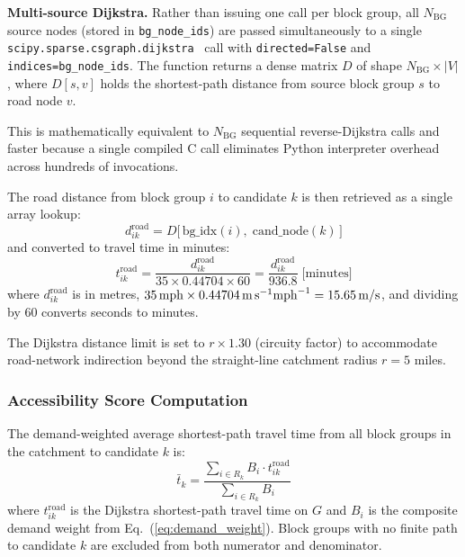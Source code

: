 \documentclass[conference]{IEEEtran}
\begin{document}
\textbf{Multi-source Dijkstra.} Rather than issuing one call per
block group, all $N_{\text{BG}}$ source nodes (stored in
\texttt{bg\_node\_ids}) are passed simultaneously to a single
\texttt{scipy.sparse.csgraph.dijkstra}~\cite{Virtanen2020} call
with \texttt{directed=False} and \texttt{indices=bg\_node\_ids}.
The function returns a dense matrix $D$ of shape
$N_{\text{BG}} \times |V|$, where $D[s, v]$ holds the
shortest-path distance from source block group $s$ to road node $v$.

This is mathematically equivalent to $N_{\text{BG}}$ sequential
reverse-Dijkstra calls and faster because a single compiled C call
eliminates Python interpreter overhead across hundreds of invocations.

The road distance from block group $i$ to candidate $k$ is then
retrieved as a single array lookup:
\begin{equation}
d_{ik}^{\text{road}} = D\bigl[\,\text{bg\_idx}(i),\;
                                \text{cand\_node}(k)\,\bigr]
\label{eq:lookup}
\end{equation}
and converted to travel time in minutes:
\begin{equation}
t_{ik}^{\text{road}}
  = \frac{d_{ik}^{\text{road}}}{35 \times 0.44704 \times 60}
  = \frac{d_{ik}^{\text{road}}}{936.8}\;\text{[minutes]}
\label{eq:ttime}
\end{equation}
where $d_{ik}^{\text{road}}$ is in metres, $35\,\text{mph} \times
0.44704\,\text{m\,s}^{-1}\text{mph}^{-1} = 15.65\,\text{m/s}$,
and dividing by 60 converts seconds to minutes.

The Dijkstra distance limit is set to $r \times 1.30$ (circuity
factor) to accommodate road-network indirection beyond the
straight-line catchment radius $r = 5$ miles.

\subsubsection{Accessibility Score Computation}

The demand-weighted average shortest-path travel time from all block
groups in the catchment to candidate $k$ is:
\begin{equation}
\bar{t}_k = \frac{\sum_{i \in R_k} B_i \cdot t_{ik}^{\text{road}}}
                  {\sum_{i \in R_k} B_i}
\label{eq:tbar}
\end{equation}
where $t_{ik}^{\text{road}}$ is the Dijkstra shortest-path travel
time on $G$ and $B_i$ is the composite demand weight from
Eq.~(\ref{eq:demand_weight}). Block groups with no finite path to
candidate $k$ are excluded from both numerator and denominator.
\end{document}
